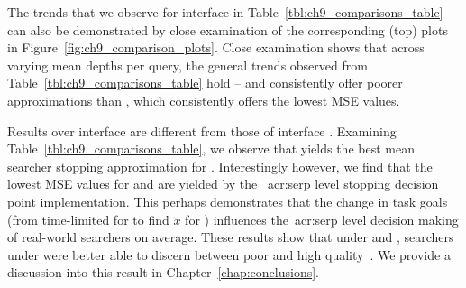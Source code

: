 The trends that we observe for interface  in Table~\ref{tbl:ch9_comparisons_table} can also be demonstrated by close examination of the corresponding (top) plots in Figure~\ref{fig:ch9_comparison_plots}. Close examination shows that across varying mean depths per query, the general trends observed from Table~\ref{tbl:ch9_comparisons_table} hold --  and  consistently offer poorer approximations than , which consistently offers the lowest MSE values.

Results over interface  are different from those of interface . Examining Table~\ref{tbl:ch9_comparisons_table}, we observe that  yields the best mean searcher stopping approximation for . Interestingly however, we find that the lowest MSE values for  and  are yielded by the ~\gls{acr:serp} level stopping decision point implementation. This perhaps demonstrates that the change in task goals (from time-limited for  to find $x$ for ) influences the~\gls{acr:serp} level decision making of real-world searchers on average. These results show that under  and , searchers under  were better able to discern between poor and high quality~. We provide a discussion into this result in Chapter~\ref{chap:conclusions}.

